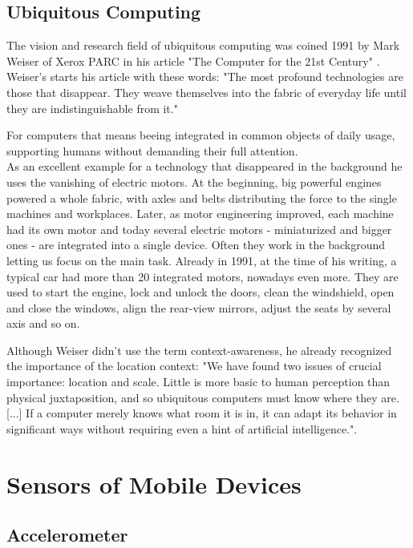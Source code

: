 \subsection{Ubiquitous Computing}

The vision and research field of ubiquitous computing was coined 1991 by Mark Weiser of Xerox PARC in his article "The Computer for the 21st Century" \cite{weiserm1991}. 
Weiser's starts his article with these words:
"The most profound technologies are those that disappear. They weave themselves into the fabric of everyday life until they are indistinguishable from it."

For computers that means beeing integrated in common objects of daily usage, supporting humans without demanding their full attention. \\
As an excellent example for a technology that disappeared in the background he uses the vanishing of electric motors. At the beginning, big powerful engines powered a whole fabric, with axles and belts distributing the force to the single machines and workplaces. Later, as motor engineering improved, each machine had its own motor and today several electric motors - miniaturized and bigger ones - are integrated into a single device. Often they work in the background letting us focus on the main task. Already in 1991, at the time of his writing, a typical car had more than 20 integrated motors, nowadays even more. They are used to start the engine, lock and unlock the doors, clean the windshield, open and close the windows, align the rear-view mirrors, adjust the seats by several axis and so on. 

Although Weiser didn't use the term context-awareness, he already recognized the importance of the location context: "We have found two issues of crucial importance: location and scale. Little is more basic to human perception than physical juxtaposition, and so ubiquitous computers must know where they are. [...] If a computer merely knows what room it is in, it can adapt its behavior in significant ways without requiring even a hint of artificial intelligence.".

\section{Sensors of Mobile Devices}

\subsection*{Accelerometer}

